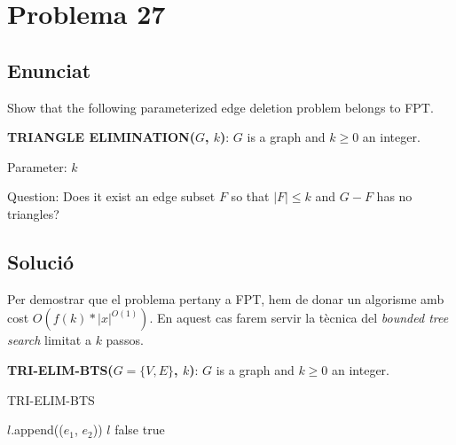 \section{Problema 27}
\subsection{Enunciat}
Show that the following parameterized edge deletion problem belongs to FPT.
\par
\textbf{TRIANGLE ELIMINATION($G$, $k$)}: $G$ is a graph and $k\geq0$ an integer.
\par
Parameter: $k$
\par
Question: Does it exist an edge subset $F$ so that $|F| \leq k$ and $G-F$ has no triangles?

\subsection{Solució}
Per demostrar que el problema pertany a FPT, hem de donar un algorisme amb cost $O(f(k)*|x|^{O(1)})$.
En aquest cas farem servir la tècnica del \textit{bounded tree search} limitat a $k$ passos.
\par
\textbf{TRI-ELIM-BTS($G=\{V,E\}$, $k$)}: $G$ is a graph and $k\geq0$ an integer.

\begin{algorithm}
\caption{TRI-ELIM-BTS}\label{euclid}
\begin{algorithmic}[1]
 
            \State $l$.append(($e_1$, $e_2$))
        \EndIf
    \EndFor
\EndFor
\State \Return $l$
\EndFunction
\newline
{}
    \State \Return false
\EndIf
{} 
 
    \EndFor
    \State \Return true
    \EndIf
\EndFor
\State {} 
\EndFunction
\end{algorithmic}
\end{algorithm}

